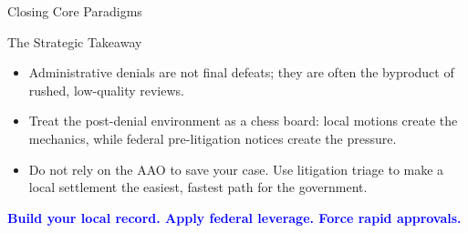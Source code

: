 \documentclass[11pt]{beamer}
\begin{document}
	\begin{frame}{Closing Core Paradigms}
		\scriptsize
		\begin{block}{The Strategic Takeaway}
			\begin{itemize}
				\item Administrative denials are not final defeats; they are often the byproduct of rushed, low-quality reviews.
				\item Treat the post-denial environment as a chess board: local motions create the mechanics, while federal pre-litigation notices create the pressure.
				\item Do not rely on the AAO to save your case. Use litigation triage to make a local settlement the easiest, fastest path for the government.
			\end{itemize}
			\vspace{0.3cm}
			\centering
			\textcolor{blue}{\textbf{Build your local record. Apply federal leverage. Force rapid approvals.}}
		\end{block}
	\end{frame}
	
\end{document}
